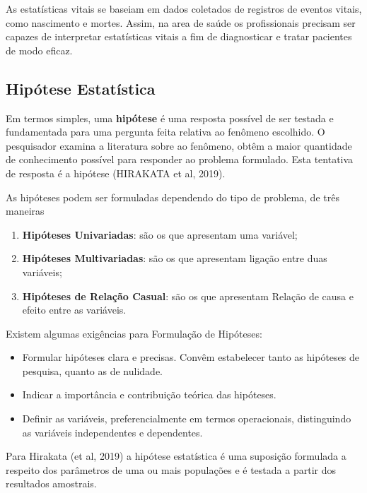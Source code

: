 As estatísticas vitais se baseiam em dados coletados de registros de eventos vitais, como nascimento e mortes. Assim, na area de saúde os profissionais precisam ser capazes de interpretar  estatísticas vitais a fim de diagnosticar e tratar pacientes de modo eficaz.








\subsection{Hipótese Estatística}

Em termos simples, uma \textbf{hipótese} é uma resposta possível de ser testada e fundamentada para uma pergunta feita relativa ao fenômeno escolhido. O pesquisador examina a literatura sobre ao fenômeno, obtêm a maior quantidade de conhecimento possível para responder ao problema formulado. Esta tentativa de resposta é a hipótese (HIRAKATA et al, 2019).\vskip0.3cm    

As hipóteses podem ser formuladas dependendo do tipo de problema, de três maneiras


\begin{enumerate}
\item \textbf{Hipóteses Univariadas}: são os que apresentam uma variável;  
\item \textbf{Hipóteses Multivariadas}: são os que apresentam ligação entre duas variáveis;
\item \textbf{Hipóteses de Relação Casual}: são os que apresentam Relação de causa e efeito entre as variáveis.
\end{enumerate}


Existem algumas exigências para Formulação de Hipóteses:

\begin{itemize}
\item Formular hipóteses clara e precisas. Convêm estabelecer tanto as hipóteses de pesquisa, quanto as de nulidade.  
\item Indicar a importância e contribuição teórica das hipóteses.
\item Definir as variáveis, preferencialmente em termos operacionais, distinguindo as variáveis independentes e dependentes. 
\end{itemize}

Para Hirakata (et al, 2019) a hipótese estatística é uma suposição formulada a respeito dos parâmetros de uma ou mais populações e é testada a partir dos resultados amostrais. 

